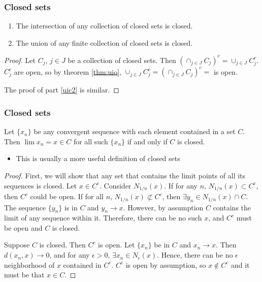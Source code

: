 \documentclass[compress]{beamer}
\renewcommand{\to}{{\rightarrow}}
\begin{document}
\begin{frame}
  \frametitle{Closed sets}
  \begin{theorem} \label{thm:uic}
    \begin{enumerate}
    \item The intersection of any collection of closed sets is closed.
    \item\label{uic2} The union of any finite collection of closed sets
      is closed.  
    \end{enumerate}
  \end{theorem}
  \begin{proof}
    Let $C_j$, $j\in J$ be a collection of closed sets. Then 
    $ \left(\cap_{j \in J} C_j\right)^c = \cup_{j \in J}
    C^c_j $. 
    $C^c_j$ are open, so by theorem \ref{thm:uio},  $\cup_{j \in J}
    C^c_j = \left(\cap_{j \in J} C_j\right)^c =$ is open.  
    
    The proof of part \ref{uic2} is similar. 
  \end{proof}
\end{frame}

\begin{frame}
  \frametitle{Closed sets}
  \begin{theorem}\label{thm:clim}
    Let $\{x_n\}$ be any convergent sequence with each element contained
    in a set $C$. Then $\lim x_n = x \in C$ for all such $\{x_n\}$ if
    and only if $C$ is closed.
  \end{theorem}
  \begin{itemize}
  \item This is usually a more useful definition of closed sets 
  \end{itemize}
\end{frame}

\begin{frame}
  \begin{proof}
    First, we will show that any set that contains the limit points of
    all its sequences is closed. Let $x \in C^c$. Consider
    $N_{1/n}(x)$. If for any $n$, $N_{1/n}(x) \subset C^c$, then $C^c$
    could be open. If for all $n$, $N_{1/n}(x) \not \subset C^c$, then
    $\exists y_n \in N_{1/n}(x) \cap C$. The sequence $\{y_n\}$ is in
    $C$ and $y_n \to x$. However, by assumption $C$ contains the limit
    of any sequence within it. Therefore, there can be no such $x$,
    and $C^c$ must be open and $C$ is closed.
    
    Suppose $C$ is closed. Then $C^c$ is open. Let $\{x_n\}$ be in $C$
    and $x_n \to x$. Then $d(x_n, x) \to 0$, and for any $\epsilon > 0$,
    $\exists x_n \in N_\epsilon(x)$. Hence, there can be no $\epsilon$
    neighborhood of $x$ contained in $C^c$. $C^c$ is open by assumption,
    so $x \not\in C^c$ and it must be that $x \in C$. 
  \end{proof}
\end{frame}
\end{document}
